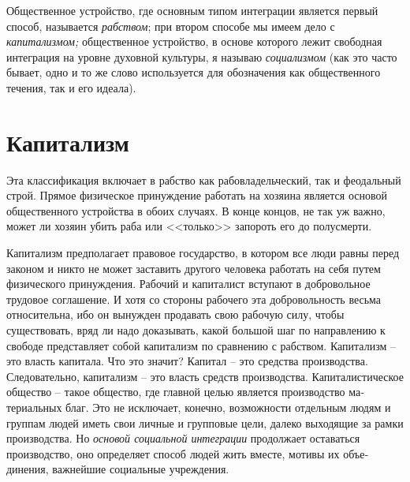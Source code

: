 \documentclass{book}
\begin{document}
Общественное устройство, где основным типом интеграции является первый способ, называется \textit{рабством};  при втором способе мы имеем дело с \textit{капитализмом;}  общественное устройство, в основе которого лежит свободная интеграция на уровне духовной культуры, я называю \textit{социализмом}  (как это часто бывает, одно и то же слово используется для обозначения как общественного течения, так и его идеала).



\section{Капитализм}

Эта классификация включает в рабство как рабовладельческий, так и феодальный строй. Прямое физическое принуждение работать на хозяина является основой общественного устройства в обоих случаях. В конце концов, не так уж важно, может ли хозяин убить раба или <<только>> запороть его до полусмерти.

Капитализм предполагает правовое государство, в котором все люди равны перед законом и никто не может заставить другого человека работать на себя путем физического принуждения. Рабочий и капиталист вступают в добровольное трудовое соглашение. И хотя со стороны рабочего эта добровольность весьма относительна, ибо он вынужден продавать свою рабо­чую силу, чтобы существовать, вряд ли надо доказывать, какой большой шаг по направлению к свободе представляет собой капитализм по сравнению с рабством.
Капитализм -- это власть капитала. Что это значит? Капитал -- это средства производства. Следовательно, капитализм -- это власть средств производства. Капиталистическое общество -- такое общество, где главной целью является производство ма­териальных благ. Это не исключает, конечно, возможности от­дельным людям и группам людей иметь свои личные и группо­вые цели, далеко выходящие за рамки производства. Но \textit{осно­вой социальной интеграции}  продолжает оставаться производст­во, оно определяет способ людей жить вместе, мотивы их объе­динения, важнейшие социальные учреждения.
\end{document}
